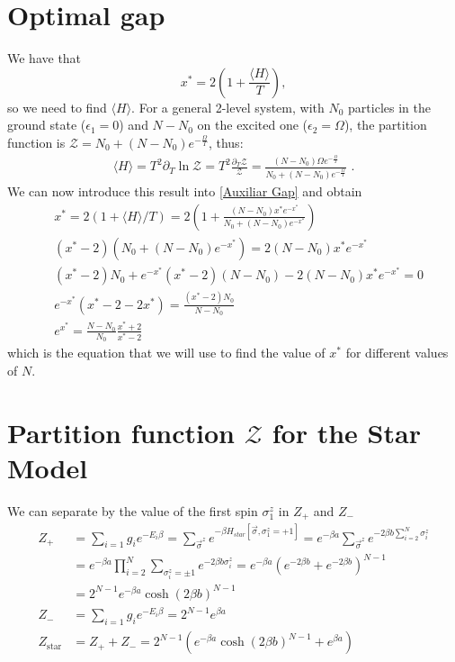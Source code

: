 \section{Optimal gap}\label{Optimal Gap}
We have that
\begin{equation}\label{Auxiliar Gap}
    x^*=2\left(1+\frac{\langle H \rangle}{T}\right) ,
\end{equation}
so we need to find $\langle H \rangle$. For a general 2-level system, with $N_0$ particles in the ground state ($\epsilon_1=0$) and $N-N_0$ on the excited one ($\epsilon_2=\Omega$), the partition function is $\mathcal{Z}=N_0+(N-N_0)e^{-\frac{\Omega}{T}}$, thus:
\begin{align}
   \langle H \rangle=T^2\partial_T\ln{\mathcal{Z}}=T^2\frac{\partial_T\mathcal{Z}}{\mathcal{Z}}=\frac{(N-N_0)\Omega e^{-\frac{\Omega}{T}}}{N_0+(N-N_0)e^{-\frac{\Omega}{T}}}
   \label{expectedH_general}\,\, .
\end{align}
We can now introduce this result into \eqref{Auxiliar Gap} and obtain
\begin{align}
    &x^*=2(1+\langle H \rangle/T) = 2\left(1 + \frac{(N-N_0)x^* e^{-x^*}}{N_0+(N-N_0)e^{-x^*}}\right)\\
    &(x^*-2)(N_0+(N-N_0)e^{-x^*})=2(N-N_0)x^* e^{-x^*}\\
    &(x^*-2)N_0 + e^{-x^*} (x^*-2)(N-N_0) -2(N-N_0)x^* e^{-x^*} = 0 \\
    &e^{-x^*}\left(x^*-2-2x^*\right)=\frac{(x^*-2)N_0}{N-N_0} \\
    &e^{x^*} = \frac{N-N_0}{N_0}\frac{x^*+2}{x^*-2}
    \label{A4}
\end{align}
which is the equation that we will use to find the value of $x^*$ for different values of $N$.

\section{Partition function $\mathcal{Z}$ for the Star Model}\label{Z_star_A}
We can separate by the value of the first spin $\sigma_1^z$ in $Z_+$ and $Z_-$
\begin{align}
    Z_+
    &=\sum_{i=1}g_ie^{-E_i\beta}=\sum_{\vec{\sigma}^z}e^{-\beta H_{star}[\vec{\sigma},\sigma_1^z=+1]}=e^{-\beta a}\sum_{\vec{\sigma}^z}e^{-2\beta b \sum_{i=2}^N \sigma_i^z} \\ 
    &=e^{-\beta a}\prod_{i=2}^N\sum_{\sigma_i^z=\pm1}e^{-2\beta b\sigma_i^z}=e^{-\beta a}(e^{-2\beta b}+e^{-2\beta b})^{N-1} \\[5pt]  
    &= 2^{N-1}e^{-\beta a}\cosh(2\beta b)^{N-1}\\[7pt]
    Z_-
    &=\sum_{i=1}g_ie^{-E_i\beta}=2^{N-1}e^{\beta a}\\[2pt]
    Z_{\text{star}}
    &=Z_+ + Z_-=2^{N-1}(e^{-\beta a}\cosh(2\beta b )^{N-1}+e^{\beta a}) 
\end{align}

